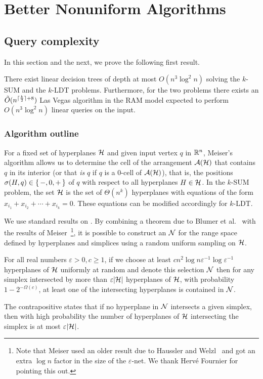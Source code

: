 \chapter{Better Nonuniform Algorithms}

\section{Query complexity}
\label{sec:query-complexity}

In this section and the next, we prove the following first result.
\begin{theorem}
\label{thm:cube}
There exist linear decision trees of depth at most \(O(n^3\log^2 n)\) solving
the \(k\)-SUM and the \(k\)-LDT problems. Furthermore, for the two problems there
exists an $\tilde{O}(n^{\lceil\frac{k}{2}\rceil+8})$ Las Vegas algorithm in
the RAM model expected to perform $O(n^3\log^2 n)$ linear queries on the input.
\end{theorem}

\subsection{Algorithm outline}
For a fixed set of hyperplanes \(\mathcal{H}\) and given input vertex \(q\) in \(\mathbb{R}^n\),
Meiser's algorithm allows us to determine the cell of the arrangement
$\mathcal{A}(\mathcal{H})$ that contains $q$ in its interior (or that \emph{is} $q$ if
$q$ is a $0$-cell of $\mathcal{A}(\mathcal{H})$), that is, the positions $\sigma(H,q) \in
\left\{\,{-, 0, +}\,\right\}$ of \(q\) with respect to all hyperplanes $H \in \mathcal{H}$. In the \(k\)-SUM
problem, the set $\mathcal{H}$ is the set of $\Theta(n^k)$ hyperplanes with equations of the
form $x_{i_1} + x_{i_2} + \cdots + x_{i_k} = 0$. 
These equations can be modified accordingly for \(k\)-LDT.

We use standard results on \enets{}. By combining a theorem due to Blumer et
al.~\cite{BEHW89} with the results of Meiser~\cite{M93}\footnote{Note that
Meiser used an older result due to Haussler and Welzl~\cite{H87} and got an
extra $\log n$ factor in the size of the $\varepsilon$-net. We thank Hervé
Fournier for pointing this out.}, it is possible to
construct an \enet{} \(\mathcal{N}\) for the range space
defined by hyperplanes and simplices using a random uniform sampling on \(\mathcal{H}\).
\begin{theorem}\label{thm:enet}
	For all real numbers $\varepsilon > 0, c \ge 1$,
	if we choose at least \(c n^2 \log n \varepsilon^{-1} \log
	\varepsilon^{-1} \) hyperplanes of \(\mathcal{H}\) uniformly at
random and denote this selection \(\mathcal{N}\) then for
any simplex intersected by more than \(\varepsilon |{\mathcal{H}}|\) hyperplanes of
\(\mathcal{H}\), with probability $1 - 2^{-\Omega(c)}$, at least one of the intersecting hyperplanes
is contained in \(\mathcal{N}\).
\end{theorem}
The contrapositive states that if no hyperplane in \(\mathcal{N}\) intersects
a given simplex, then with high probability the number of hyperplanes of
\(\mathcal{H}\) intersecting the simplex is at most \(\varepsilon |{\mathcal{H}}|\).

